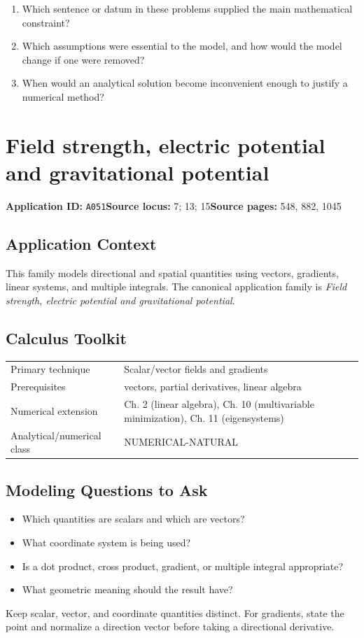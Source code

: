 \documentclass[11pt]{book}
\newcommand{\pid}[1]{\texttt{#1}}
\begin{document}
\begin{reflectionbox}\begin{enumerate}
\item Which sentence or datum in these problems supplied the main mathematical constraint?
\item Which assumptions were essential to the model, and how would the model change if one were removed?
\item When would an analytical solution become inconvenient enough to justify a numerical method?
\end{enumerate}\end{reflectionbox}
\chapter{Field strength, electric potential and gravitational potential}\label{app:A051}
\textbf{Application ID:} \pid{A051}\quad \textbf{Source locus:} 7; 13; 15\quad \textbf{Source pages:} 548, 882, 1045
\section*{Application Context}
This family models directional and spatial quantities using vectors, gradients, linear systems, and multiple integrals. The canonical application family is \emph{Field strength, electric potential and gravitational potential}.
\section*{Calculus Toolkit}
\begin{tabularx}{\textwidth}{@{}lX@{}}\toprule
Primary technique & Scalar/vector fields and gradients \\
Prerequisites & vectors, partial derivatives, linear algebra \\
Numerical extension & Ch. 2 (linear algebra), Ch. 10 (multivariable minimization), Ch. 11 (eigensystems) \\
Analytical/numerical class & NUMERICAL-NATURAL \\
\bottomrule\end{tabularx}
\section*{Modeling Questions to Ask}\begin{itemize}
\item Which quantities are scalars and which are vectors?
\item What coordinate system is being used?
\item Is a dot product, cross product, gradient, or multiple integral appropriate?
\item What geometric meaning should the result have?
\end{itemize}
\begin{errorbox}Keep scalar, vector, and coordinate quantities distinct. For gradients, state the point and normalize a direction vector before taking a directional derivative.\end{errorbox}
\end{document}
